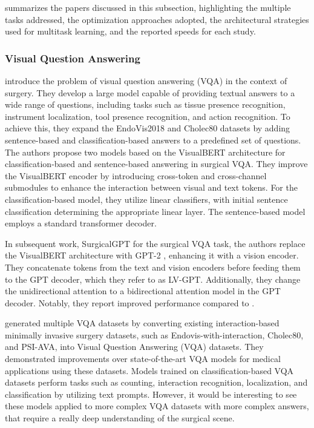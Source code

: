  summarizes the papers discussed in this subsection, highlighting the multiple tasks addressed, the optimization approaches adopted, the architectural strategies used for multitask learning, and the reported speeds for each study.



\subsubsection{Visual Question Answering}
\citet{seenivasan2022surgical} introduce the problem of visual question answering (VQA) in the context of surgery. They develop a large model capable of providing textual answers to a wide range of questions, including tasks such as tissue presence recognition, instrument localization, tool presence recognition, and action recognition. To achieve this, they expand the EndoVis2018 and Cholec80 datasets by adding sentence-based and classification-based answers to a predefined set of questions. The authors propose two models based on the VisualBERT architecture \citep{li2019visualbert} for classification-based and sentence-based answering in surgical VQA. They improve the VisualBERT encoder by introducing cross-token and cross-channel submodules to enhance the interaction between visual and text tokens. For the classification-based model, they utilize linear classifiers, with initial sentence classification determining the appropriate linear layer. The sentence-based model employs a standard transformer decoder.

In subsequent work, SurgicalGPT \citep{seenivasan2023surgicalgpt} for the surgical VQA task, the authors replace the VisualBERT architecture with GPT-2 \citep{radford2019language}, enhancing it with a vision encoder. They concatenate tokens from the text and vision encoders before feeding them to the GPT decoder, which they refer to as LV-GPT. Additionally, they change the unidirectional attention to a bidirectional attention model in the GPT decoder. Notably, they report improved performance compared to \citet{seenivasan2022surgical}. 

\citet{seenivasan2022surgical,seenivasan2023surgicalgpt} generated multiple VQA datasets by converting existing interaction-based minimally invasive surgery datasets, such as Endovis-with-interaction, Cholec80, and PSI-AVA, into Visual Question Answering (VQA) datasets. They demonstrated improvements over state-of-the-art VQA models for medical applications using these datasets.
Models trained on classification-based VQA datasets perform tasks such as counting, interaction recognition, localization, and classification by utilizing text prompts. However, it would be interesting to see these models applied to more complex VQA datasets with more complex answers, that require a really deep understanding of the surgical scene.  

